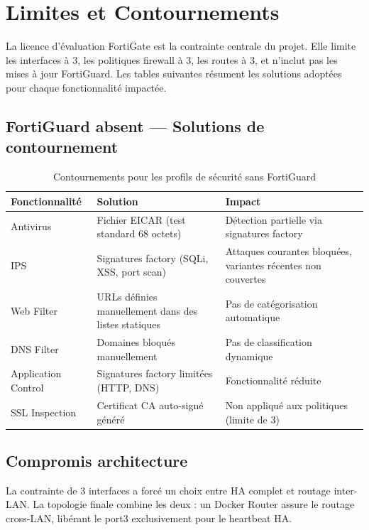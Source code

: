 \chapter{Limites et Contournements}
\label{chap:limites}

La licence d'évaluation FortiGate est la contrainte centrale du projet. Elle limite les interfaces à 3, les politiques firewall à 3, les routes à 3, et n'inclut pas les mises à jour FortiGuard. Les tables suivantes résument les solutions adoptées pour chaque fonctionnalité impactée.

\section{FortiGuard absent --- Solutions de contournement}

\begin{table}[H]
\centering
\caption{Contournements pour les profils de sécurité sans FortiGuard}
\label{tab:workarounds}
\begin{tabularx}{\textwidth}{|l|X|X|}
\hline
\textbf{Fonctionnalité} & \textbf{Solution} & \textbf{Impact} \\
\hline
Antivirus & Fichier EICAR (test standard 68 octets) & Détection partielle via signatures factory \\
\hline
IPS & Signatures factory (SQLi, XSS, port scan) & Attaques courantes bloquées, variantes récentes non couvertes \\
\hline
Web Filter & URLs définies manuellement dans des listes statiques & Pas de catégorisation automatique \\
\hline
DNS Filter & Domaines bloqués manuellement & Pas de classification dynamique \\
\hline
Application Control & Signatures factory limitées (HTTP, DNS) & Fonctionnalité réduite \\
\hline
SSL Inspection & Certificat CA auto-signé généré & Non appliqué aux politiques (limite de 3) \\
\hline
\end{tabularx}
\end{table}

\section{Compromis architecture}

La contrainte de 3 interfaces a forcé un choix entre HA complet et routage inter-LAN. La topologie finale combine les deux : un Docker Router assure le routage cross-LAN, libérant le port3 exclusivement pour le heartbeat HA.

